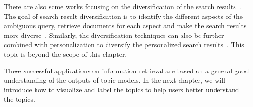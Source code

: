 There are also some works focusing on the diversification of the search results~\citep{Dang-2013,Santos-2015}. The goal of search result diversification is to identify the different aspects of the ambiguous query, retrieve documents for each aspect and make the search results more diverse~\citep{Dang-2013}. Similarly, the diversification techniques can also be further combined with personalization to diversify the personalized search results~\citep{Vallet-2012,Liang-2014}. This topic is beyond the scope of this chapter.

These successful applications on information retrieval are based on a general good
understanding of the outputs of topic models. In the next chapter, we
will introduce how to visualize and label the topics to
help users better understand the topics.
